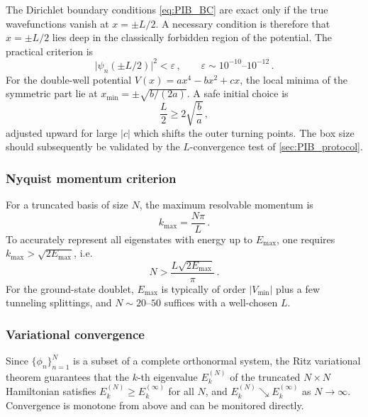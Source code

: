 The Dirichlet boundary conditions \cref{eq:PIB_BC} are exact only if the true
wavefunctions vanish at $x = \pm L/2$.  A necessary condition is therefore that
$x = \pm L/2$ lies deep in the classically forbidden region of the potential.
The practical criterion is
\begin{equation}\label{eq:PIB_L_crit}
  \bigl|\psi_n(\pm L/2)\bigr|^2 < \varepsilon\,,\qquad
  \varepsilon \sim 10^{-10}\text{--}10^{-12}\,.
\end{equation}
For the double-well potential $V(x) = ax^4 - bx^2 + cx$, the local minima of the
symmetric part lie at $x_{\min} = \pm\sqrt{b/(2a)}$.  A safe initial choice is
\begin{equation}\label{eq:PIB_L_dw}
  \frac{L}{2} \geq 2\sqrt{\frac{b}{a}}\,,
\end{equation}
adjusted upward for large $|c|$ which shifts the outer turning points.  The
box size should subsequently be validated by the $L$-convergence test of
\cref{sec:PIB_protocol}.

\subsubsection{Nyquist momentum criterion}

For a truncated basis of size $N$, the maximum resolvable momentum is
\begin{equation}\label{eq:PIB_kmax}
  k_{\max} = \frac{N\pi}{L}\,.
\end{equation}
To accurately represent all eigenstates with energy up to $E_{\max}$,
one requires $k_{\max} > \sqrt{2E_{\max}}$, i.e.\
\begin{equation}\label{eq:PIB_N_crit}
  N > \frac{L\sqrt{2E_{\max}}}{\pi}\,.
\end{equation}
For the ground-state doublet, $E_{\max}$ is typically of order $|V_{\min}|$
plus a few tunneling splittings, and $N \sim 20$--$50$ suffices with a
well-chosen $L$.

\subsubsection{Variational convergence}

Since $\{\phi_n\}_{n=1}^N$ is a subset of a complete orthonormal system, the
Ritz variational theorem guarantees that the $k$-th eigenvalue $E_k^{(N)}$ of
the truncated $N\times N$ Hamiltonian satisfies $E_k^{(N)} \geq E_k^{(\infty)}$
for all $N$, and $E_k^{(N)} \searrow E_k^{(\infty)}$ as $N \to \infty$.
Convergence is monotone from above and can be monitored directly.

